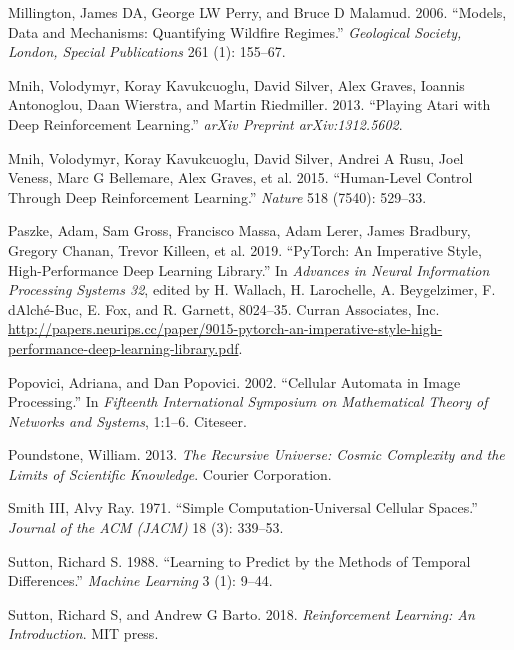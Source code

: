 \documentclass[
  openany]{book}
\newlength{\cslhangindent}
\newenvironment{cslreferences}%
  {\setlength{\parindent}{0pt}%
  \everypar{\setlength{\hangindent}{\cslhangindent}}\ignorespaces}%
  {\par}
\begin{document}
\begin{cslreferences}
\leavevmode\hypertarget{ref-millington2006models}{}%
Millington, James DA, George LW Perry, and Bruce D Malamud. 2006. ``Models, Data and Mechanisms: Quantifying Wildfire Regimes.'' \emph{Geological Society, London, Special Publications} 261 (1): 155--67.

\leavevmode\hypertarget{ref-mnih2013playing}{}%
Mnih, Volodymyr, Koray Kavukcuoglu, David Silver, Alex Graves, Ioannis Antonoglou, Daan Wierstra, and Martin Riedmiller. 2013. ``Playing Atari with Deep Reinforcement Learning.'' \emph{arXiv Preprint arXiv:1312.5602}.

\leavevmode\hypertarget{ref-mnih2015human}{}%
Mnih, Volodymyr, Koray Kavukcuoglu, David Silver, Andrei A Rusu, Joel Veness, Marc G Bellemare, Alex Graves, et al. 2015. ``Human-Level Control Through Deep Reinforcement Learning.'' \emph{Nature} 518 (7540): 529--33.

\leavevmode\hypertarget{ref-NEURIPS2019_9015}{}%
Paszke, Adam, Sam Gross, Francisco Massa, Adam Lerer, James Bradbury, Gregory Chanan, Trevor Killeen, et al. 2019. ``PyTorch: An Imperative Style, High-Performance Deep Learning Library.'' In \emph{Advances in Neural Information Processing Systems 32}, edited by H. Wallach, H. Larochelle, A. Beygelzimer, F. d\textquotesingle Alché-Buc, E. Fox, and R. Garnett, 8024--35. Curran Associates, Inc. \url{http://papers.neurips.cc/paper/9015-pytorch-an-imperative-style-high-performance-deep-learning-library.pdf}.

\leavevmode\hypertarget{ref-popovici2002cellular}{}%
Popovici, Adriana, and Dan Popovici. 2002. ``Cellular Automata in Image Processing.'' In \emph{Fifteenth International Symposium on Mathematical Theory of Networks and Systems}, 1:1--6. Citeseer.

\leavevmode\hypertarget{ref-poundstone2013recursive}{}%
Poundstone, William. 2013. \emph{The Recursive Universe: Cosmic Complexity and the Limits of Scientific Knowledge}. Courier Corporation.

\leavevmode\hypertarget{ref-smith1971simple}{}%
Smith III, Alvy Ray. 1971. ``Simple Computation-Universal Cellular Spaces.'' \emph{Journal of the ACM (JACM)} 18 (3): 339--53.

\leavevmode\hypertarget{ref-sutton1988learning}{}%
Sutton, Richard S. 1988. ``Learning to Predict by the Methods of Temporal Differences.'' \emph{Machine Learning} 3 (1): 9--44.

\leavevmode\hypertarget{ref-sutton2018reinforcement}{}%
Sutton, Richard S, and Andrew G Barto. 2018. \emph{Reinforcement Learning: An Introduction}. MIT press.


\end{cslreferences}
\end{document}

